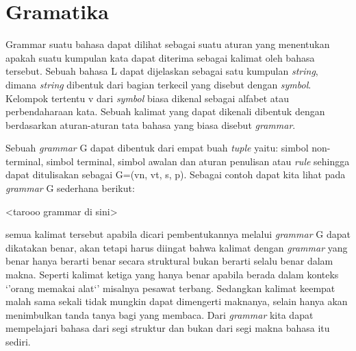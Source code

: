 \section{Gramatika}
Grammar suatu bahasa dapat dilihat sebagai suatu aturan yang menentukan apakah suatu kumpulan kata dapat diterima sebagai kalimat oleh bahasa tersebut. Sebuah bahasa L dapat dijelaskan sebagai satu kumpulan \emph{string}, dimana \emph{string} dibentuk dari bagian terkecil yang disebut dengan \emph{symbol}. Kelompok tertentu v dari \emph{symbol} biasa dikenal sebagai alfabet atau perbendaharaan kata. Sebuah kalimat yang dapat dikenali dibentuk dengan berdasarkan aturan-aturan tata bahasa yang biasa disebut \emph{grammar}.

Sebuah \emph{grammar} G dapat dibentuk dari empat buah \emph{tuple} yaitu: simbol non-terminal, simbol terminal, simbol awalan dan aturan penulisan atau \emph{rule} sehingga dapat ditulisakan sebagai G=(vn, vt, s, p). Sebagai contoh dapat kita lihat pada \emph{grammar} G sederhana berikut:

<tarooo grammar di sini>

semua kalimat tersebut apabila dicari pembentukannya melalui \emph{grammar} G dapat dikatakan benar, akan tetapi harus diingat bahwa kalimat dengan \emph{grammar} yang benar hanya berarti benar secara struktural bukan berarti selalu benar dalam makna. Seperti kalimat ketiga yang hanya benar apabila berada dalam konteks `'orang memakai alat`' misalnya pesawat terbang. Sedangkan kalimat keempat malah sama sekali tidak mungkin dapat dimengerti maknanya, selain hanya akan menimbulkan tanda tanya bagi yang membaca. Dari \emph{grammar} kita dapat mempelajari bahasa dari segi struktur dan bukan dari segi makna bahasa itu sediri.

